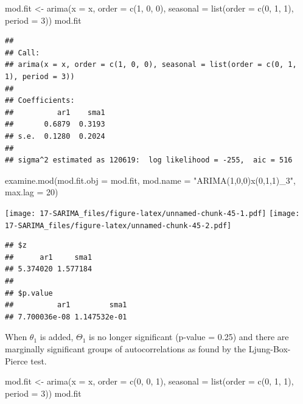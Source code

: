 \documentclass[
]{book}
\newenvironment{Shaded}{\begin{snugshade}}{\end{snugshade}}
\newcommand{\AttributeTok}[1]{\textcolor[rgb]{0.77,0.63,0.00}{#1}}
\newcommand{\DecValTok}[1]{\textcolor[rgb]{0.00,0.00,0.81}{#1}}
\newcommand{\FunctionTok}[1]{\textcolor[rgb]{0.00,0.00,0.00}{#1}}
\newcommand{\NormalTok}[1]{#1}
\newcommand{\OtherTok}[1]{\textcolor[rgb]{0.56,0.35,0.01}{#1}}
\newcommand{\StringTok}[1]{\textcolor[rgb]{0.31,0.60,0.02}{#1}}
\theoremstyle{definition}
\theoremstyle{definition}
\theoremstyle{definition}
\theoremstyle{definition}
\theoremstyle{remark}
\begin{document}
\begin{Shaded}
\begin{Highlighting}[]
\NormalTok{mod.fit }\OtherTok{\textless{}{-}} \FunctionTok{arima}\NormalTok{(}\AttributeTok{x =}\NormalTok{ x, }\AttributeTok{order =} \FunctionTok{c}\NormalTok{(}\DecValTok{1}\NormalTok{, }\DecValTok{0}\NormalTok{, }\DecValTok{0}\NormalTok{), }\AttributeTok{seasonal =} \FunctionTok{list}\NormalTok{(}\AttributeTok{order =} \FunctionTok{c}\NormalTok{(}\DecValTok{0}\NormalTok{, }\DecValTok{1}\NormalTok{, }\DecValTok{1}\NormalTok{), }\AttributeTok{period =} \DecValTok{3}\NormalTok{))}
\NormalTok{mod.fit}
\end{Highlighting}
\end{Shaded}

\begin{verbatim}
## 
## Call:
## arima(x = x, order = c(1, 0, 0), seasonal = list(order = c(0, 1, 1), period = 3))
## 
## Coefficients:
##          ar1    sma1
##       0.6879  0.3193
## s.e.  0.1280  0.2024
## 
## sigma^2 estimated as 120619:  log likelihood = -255,  aic = 516
\end{verbatim}

\begin{Shaded}
\begin{Highlighting}[]
\FunctionTok{examine.mod}\NormalTok{(}\AttributeTok{mod.fit.obj =}\NormalTok{ mod.fit, }\AttributeTok{mod.name =} \StringTok{"ARIMA(1,0,0)x(0,1,1)\_3"}\NormalTok{, }\AttributeTok{max.lag =} \DecValTok{20}\NormalTok{)}
\end{Highlighting}
\end{Shaded}

\texttt{[image: 17-SARIMA\_files/figure-latex/unnamed-chunk-45-1.pdf]} \texttt{[image: 17-SARIMA\_files/figure-latex/unnamed-chunk-45-2.pdf]}

\begin{verbatim}
## $z
##      ar1     sma1 
## 5.374020 1.577184 
## 
## $p.value
##          ar1         sma1 
## 7.700036e-08 1.147532e-01
\end{verbatim}

When \(\theta_1\) is added, \(\Theta_1\) is no longer significant (p-value = 0.25) and there are marginally significant groups of autocorrelations as found by the Ljung-Box-Pierce test.

\begin{Shaded}
\begin{Highlighting}[]
\NormalTok{mod.fit }\OtherTok{\textless{}{-}} \FunctionTok{arima}\NormalTok{(}\AttributeTok{x =}\NormalTok{ x, }\AttributeTok{order =} \FunctionTok{c}\NormalTok{(}\DecValTok{0}\NormalTok{, }\DecValTok{0}\NormalTok{, }\DecValTok{1}\NormalTok{), }\AttributeTok{seasonal =} \FunctionTok{list}\NormalTok{(}\AttributeTok{order =} \FunctionTok{c}\NormalTok{(}\DecValTok{0}\NormalTok{, }\DecValTok{1}\NormalTok{, }\DecValTok{1}\NormalTok{), }\AttributeTok{period =} \DecValTok{3}\NormalTok{))}
\NormalTok{mod.fit}
\end{Highlighting}
\end{Shaded}
\end{document}
